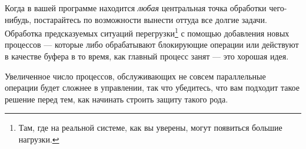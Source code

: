 \documentclass[11pt, oneside]{book}   	%
\begin{document}
Когда в вашей программе находится \emph{любая} центральная точка обработки чего-нибудь, постарайтесь по возможности вынести оттуда все долгие задачи. Обработка предсказуемых ситуаций перегрузки\footnote{Там, где на реальной системе, как вы уверены, могут появиться большие нагрузки.} с помощью добавления новых процессов --- которые либо обрабатывают блокирующие операции или действуют в качестве буфера в то время, как главный процесс занят --- это хорошая идея.

Увеличенное число процессов, обслуживающих не совсем параллельные операции будет сложнее в управлении, так что убедитесь, что вам подходит такое решение перед тем, как начинать строить защиту такого рода.
\end{document}
